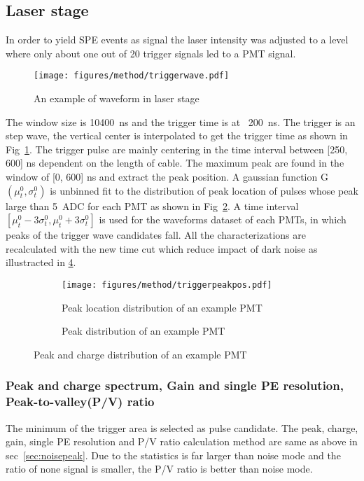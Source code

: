 \subsection{Laser stage}
In order to yield SPE events as signal the laser intensity was adjusted to a level where only
about one out of 20 trigger signals led to a PMT signal.
\begin{figure}[!htbp]
    \centering
    \texttt{[image: figures/method/triggerwave.pdf]}
    \caption{An example of waveform in laser stage}
    \label{fig:triggertime}
\end{figure}
The window size is \SI{10400}{ns} and the trigger time is at ~\SI{200}{ns}. The trigger is an step wave, the vertical center is interpolated to get the trigger time as shown in Fig~\ref{fig:triggertime}. The trigger pulse are mainly centering in the time interval between [250, 600] ns dependent on the length of cable. The maximum peak are found in the window of [0, 600] ns and extract the peak position. A gaussian function G$(\mu_t^0,\sigma_t^0)$ is unbinned fit to the distribution of peak location of pulses whose peak large than \SI{5}{ADC} for each PMT as shown in Fig~\ref{fig:peaklocation}. A time interval $[\mu_t^0-3\sigma_t^0, \mu_t^0+3\sigma_t^0]$ is used for the waveforms dataset of each PMTs, in which peaks of the trigger wave candidates fall. All the characterizations are recalculated with the new time cut which reduce impact of dark noise as illustracted in \ref{fig:peakselected}.
\begin{figure}[!htbp]
    \centering
    \begin{subfigure}[t]{0.45\textwidth}
        \texttt{[image: figures/method/triggerpeakpos.pdf]}
        \caption{Peak location distribution of an example PMT}%
        \label{fig:peaklocation}
    \end{subfigure}
    \begin{subfigure}[t]{0.45\textwidth}
        \caption{Peak distribution of an example PMT}%
        \label{fig:peakselected}
    \end{subfigure}
    \caption{Peak and charge distribution of an example PMT}
\end{figure}

\subsubsection{Peak and charge spectrum, Gain and single PE resolution, Peak-to-valley(P/V) ratio}
\label{sec:triggerpeak}
The minimum of the trigger area is selected as pulse candidate. The peak, charge, gain, single PE resolution and P/V ratio calculation method are same as above in sec~\ref{sec:noisepeak}. Due to the statistics is far larger than noise mode and the ratio of none signal is smaller, the P/V ratio is better than noise mode.

